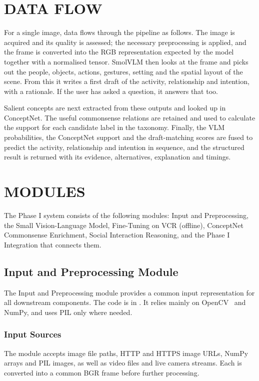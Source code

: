 \section{DATA FLOW}

For a single image, data flows through the pipeline as follows. The image is acquired and its quality is assessed; the necessary preprocessing is applied, and the frame is converted into the RGB representation expected by the model together with a normalised tensor. SmolVLM then looks at the frame and picks out the people, objects, actions, gestures, setting and the spatial layout of the scene. From this it writes a first draft of the activity, relationship and intention, with a rationale. If the user has asked a question, it answers that too.

Salient concepts are next extracted from these outputs and looked up in ConceptNet. The useful commonsense relations are retained and used to calculate the support for each candidate label in the taxonomy. Finally, the VLM probabilities, the ConceptNet support and the draft-matching scores are fused to predict the activity, relationship and intention in sequence, and the structured result is returned with its evidence, alternatives, explanation and timings.

\section{MODULES}

The Phase I system consists of the following modules: Input and Preprocessing, the Small Vision-Language Model, Fine-Tuning on VCR (offline), ConceptNet Commonsense Enrichment, Social Interaction Reasoning, and the Phase I Integration that connects them.

\subsection{Input and Preprocessing Module}
\label{sec:preproc}

The Input and Preprocessing module provides a common input representation for all downstream components. The code is in . It relies mainly on OpenCV~\cite{bradski2000opencv} and NumPy, and uses PIL only where needed.

\subsubsection{Input Sources}
The module accepts image file paths, HTTP and HTTPS image URLs, NumPy arrays and PIL images, as well as video files and live camera streams. Each is converted into a common BGR frame before further processing.

